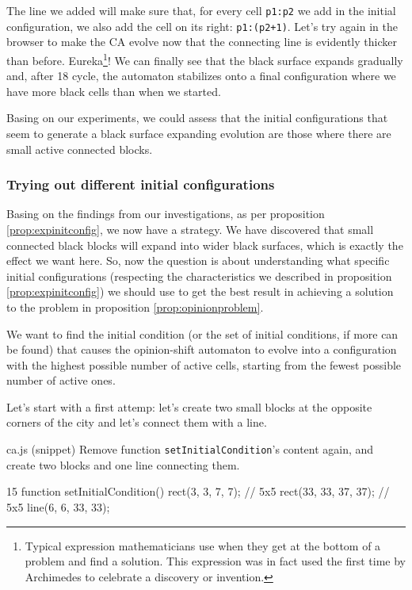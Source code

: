 The line we added will make sure that, for every cell \texttt{p1:p2}
we add in the initial configuration, we also add
the cell on its right: \texttt{p1:(p2+1)}. Let's try again in the browser to make the CA evolve
now that the connecting line is evidently thicker than before.
Eureka\footnote{Typical expression mathematicians use when they get at the bottom of
a problem and find a solution. This expression was in fact used the first time by Archimedes
to celebrate a discovery or invention.}! We can finally see that the black surface expands
gradually and, after 18 cycle, the automaton stabilizes onto a final configuration where we have
more black cells than when we started.

\begin{proposition}
\label{prop:expinitconfig}
Basing on our experiments, we could assess that the initial configurations that seem to generate
a black surface expanding evolution are those where there are small active connected blocks.
\end{proposition}

\subsubsection{Trying out different initial configurations}
Basing on the findings from our investigations, as per proposition \ref{prop:expinitconfig}, we
now have a strategy. We have discovered that small connected black blocks will expand into wider
black surfaces, which is exactly the effect we want here. So, now the question is about understanding
what specific initial configurations (respecting the characteristics we described in
proposition \ref{prop:expinitconfig}) we should use to get the best result in achieving a solution
to the problem in proposition \ref{prop:opinionproblem}.

\begin{proposition}
\label{prop:simobj}
We want to find the initial condition (or the set of initial conditions, if more can be found)
that causes the opinion-shift automaton to evolve into a configuration with the
highest possible number of active cells, starting from the fewest possible number of active ones.
\end{proposition}

Let's start with a first attemp: let's create two small blocks at the opposite corners of the city
and let's connect them with a line.

\begin{programcode}{ca.js (snippet)}
Remove function \texttt{setInitialCondition}'s content again, and create two blocks and one
line connecting them.
\begin{codeh1}{1}{5}
function setInitialCondition() {
  rect(3, 3, 7, 7); // 5x5
  rect(33, 33, 37, 37); // 5x5
  line(6, 6, 33, 33);
}
\end{codeh1}
\end{programcode}

